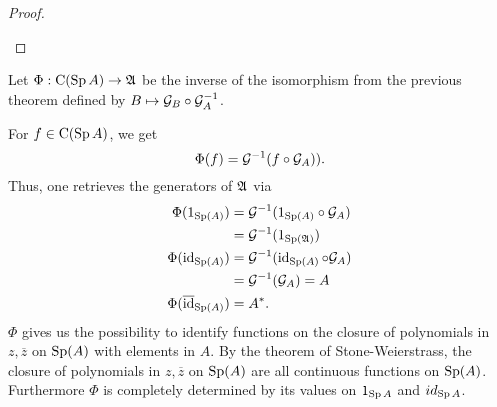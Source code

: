 \begin{proof}
 \begin{center}
 \end{center}

 




\end{proof}

\begin{rem}
  Let $\Phi : \operatorname{C} (\operatorname{Sp} A) \to \mathfrak{A}$ be the inverse of the isomorphism from the
  previous theorem defined by $B \mapsto \mathcal{G}_B \circ \mathcal{G}_A ^{-1}$.
 
  For $f \in \operatorname{C}(\operatorname{Sp} A)$, we get 
  \[
   \Phi (f) = \mathcal{G} ^{-1} (f \circ \mathcal{G}_A)).
  \]
  Thus, one retrieves the generators of $\mathfrak{A}$ via
   \begin{align*}
      \Phi (1_{\operatorname{Sp}(A)})   		&= \mathcal{G} ^{-1} (1 _{\operatorname{Sp}(A)} \circ \mathcal{G}_A ) \\
				    &= \mathcal{G} ^{-1} (1_{\operatorname{Sp}(\mathfrak{A})}) \\
      \Phi (\operatorname{id}_{\operatorname{Sp} (A)})		&= \mathcal{G} ^{-1} (\operatorname{id}_{\operatorname{Sp} (A)} \circ \mathcal{G}_A) \\
				    &= \mathcal{G} ^{-1} (\mathcal{G}_A) = A \\
      \Phi (\overline{\operatorname{id}}_{\operatorname{Sp} (A)}) 	&= A^*.
   \end{align*}
  $\Phi$ gives us the possibility to identify functions on the closure of
  polynomials in $z, \overline{z}$ on $\operatorname{Sp} (A)$ with elements in $A$. 
  By the theorem of Stone-Weierstrass, the closure of polynomials in 
  $z, \overline{z}$ on $\operatorname{Sp} (A)$ are all continuous functions on $\operatorname{Sp} (A)$.
  Furthermore  $\Phi$ is completely determined by its values on $1_{\operatorname{Sp} A}$ 
  and $id_{\operatorname{Sp} A}$.
\end{rem}

